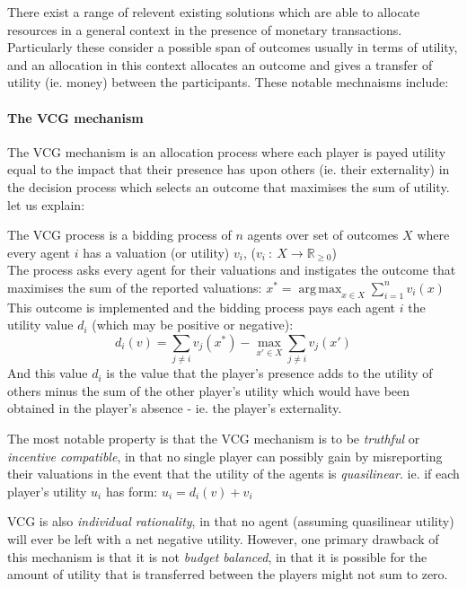 \documentclass[
10pt, %
a4paper, %
oneside, %
headinclude,footinclude, %
BCOR5mm, %
]{scrartcl}
\DeclareMathOperator*{\argmax}{arg\,max}
\begin{document}
There exist a range of relevent existing solutions which are able to allocate resources in a general context in the presence of monetary transactions.
Particularly these consider a possible span of outcomes usually in terms of utility, and an allocation in this context allocates an outcome and gives a transfer of utility (ie. money) between the participants.
These notable mechnaisms include:

\paragraph{The VCG mechanism}
The VCG mechanism is an allocation process where each player is payed utility equal to the impact that their presence has upon others (ie. their externality) in the decision process which selects an outcome that maximises the sum of utility. let us explain:

The VCG process is a bidding process of $n$ agents over set of outcomes $X$ where every agent $i$ has a valuation (or utility) $v_i$,
($ v_i~:~X\rightarrow \mathbb{R}_{\ge 0} $)\\
The process asks every agent for their valuations and instigates the outcome that maximises the sum of the reported valuations:
$ x^* = \argmax_{x\in X}\sum_{i=1}^{n}v_i(x) $\\
This outcome is implemented and the bidding process pays each agent $i$ the utility value $d_i$ (which may be positive or negative):
\begin{equation}\label{eq:VCG_payment_rule} d_i(v)=\sum_{j\ne i}v_j(x^*) - \max_{x'\in X}\sum_{j\ne i}v_j(x') \end{equation}
And this value $d_i$ is the value that the player's presence adds to the utility of others minus the sum of the other player's utility which would have been obtained in the player's absence - ie. the player's externality.


The most notable property is that the VCG mechanism is to be \textit{truthful} or \textit{incentive compatible}, in that no single player can possibly gain by misreporting their valuations in the event that the utility of the agents is \textit{quasilinear}.\cite{roberts1979characterization, Lavi2008} 
ie. if each player's utility $u_i$ has form:
$ u_i = d_i(v)+v_i $

VCG is also \textit{individual rationality}, in that no agent (assuming quasilinear utility) will ever be left with a net negative utility.
However, one primary drawback of this mechanism is that it is not \textit{budget balanced}, in that it is possible for the amount of utility that is transferred between the players might not sum to zero.
\end{document}
